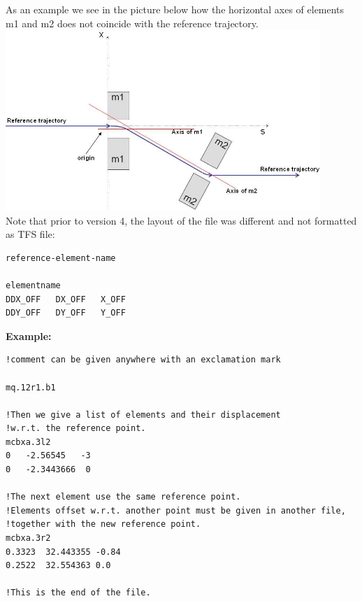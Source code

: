 As an example we see in the picture below how the horizontal axes of elements m1 and m2 
does not coincide with the reference trajectory.
\\
\includegraphics[width=450px]{Introduction/offsetelem.jpg}
\\ 

Note that prior to \madx version 4, the layout of the file was different
and not formatted as TFS file: 

\begin{verbatim}
reference-element-name

elementname
DDX_OFF   DX_OFF   X_OFF
DDY_OFF   DY_OFF   Y_OFF
\end{verbatim} 

{\bf Example:} 
\begin{verbatim}
!comment can be given anywhere with an exclamation mark

mq.12r1.b1

!Then we give a list of elements and their displacement 
!w.r.t. the reference point.
mcbxa.3l2
0   -2.56545   -3
0   -2.3443666  0

!The next element use the same reference point.
!Elements offset w.r.t. another point must be given in another file,
!together with the new reference point.
mcbxa.3r2
0.3323  32.443355 -0.84
0.2522  32.554363 0.0

!This is the end of the file.
\end{verbatim}




